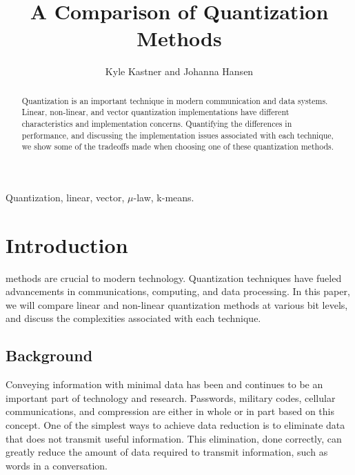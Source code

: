 \documentclass[journal]{IEEEtran}
\begin{document}
\title{A Comparison of Quantization Methods}

\author{Kyle Kastner and Johanna Hansen}%

\maketitle

\begin{abstract}
Quantization is an important technique in modern communication and data systems. Linear, non-linear, and vector quantization
implementations have different characteristics and implementation concerns. Quantifying the differences in performance, and discussing 
the implementation issues associated with each technique, we show some of the tradeoffs made when choosing one of these quantization methods.
\end{abstract}

\begin{IEEEkeywords}
Quantization, linear, vector, $\mu$-law, k-means.
\end{IEEEkeywords}

\IEEEpeerreviewmaketitle
\section{Introduction}
 methods are crucial to modern technology. Quantization techniques have fueled 
advancements in communications, computing, and data processing. In this paper, we will compare linear and non-linear 
quantization methods at various bit levels, and discuss the complexities associated with each technique.

\subsection{Background}
Conveying information with minimal data has been and continues to be an important part of technology and research. Passwords, 
military codes, cellular communications, and compression are either in whole or in part based on this concept. One of the simplest ways
to achieve data reduction is to eliminate data that does not transmit useful information. This elimination, done correctly, can 
greatly reduce the amount of data required to transmit information, such as words in a conversation.
\end{document}
